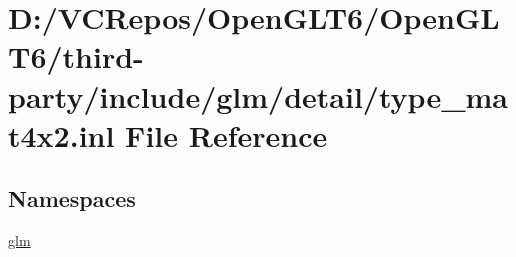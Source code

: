 \hypertarget{type__mat4x2_8inl}{}\section{D\+:/\+V\+C\+Repos/\+Open\+G\+L\+T6/\+Open\+G\+L\+T6/third-\/party/include/glm/detail/type\+\_\+mat4x2.inl File Reference}
\label{type__mat4x2_8inl}
\subsection*{Namespaces}
\begin{DoxyCompactItemize}
\item 
 \mbox{\hyperlink{namespaceglm}{glm}}
\end{DoxyCompactItemize}
